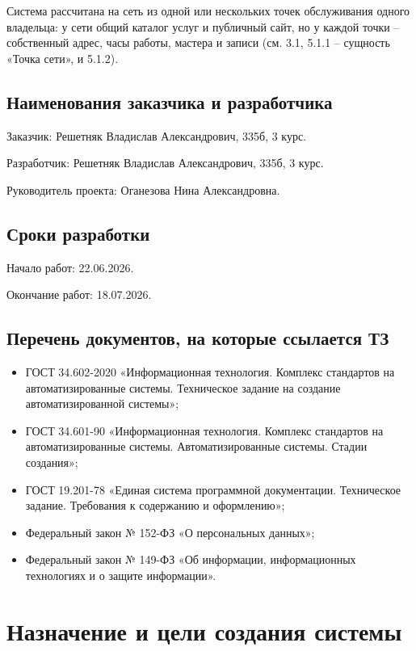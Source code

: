 Система рассчитана на сеть из одной или нескольких точек обслуживания одного владельца: у сети общий каталог услуг и публичный сайт, но у каждой точки -- собственный адрес, часы работы, мастера и записи (см. 3.1, 5.1.1 -- сущность «Точка сети», и 5.1.2).

\subsection{Наименования заказчика и разработчика}

Заказчик: Решетняк Владислав Александрович, 335б, 3 курс.

Разработчик: Решетняк Владислав Александрович, 335б, 3 курс.

Руководитель проекта: Оганезова Нина Александровна.

\subsection{Сроки разработки}

Начало работ: 22.06.2026.

Окончание работ: 18.07.2026.

\subsection{Перечень документов, на которые ссылается ТЗ}

\begin{itemize}
  \item ГОСТ 34.602-2020 «Информационная технология. Комплекс стандартов на автоматизированные системы. Техническое задание на создание автоматизированной системы»;
  \item ГОСТ 34.601-90 «Информационная технология. Комплекс стандартов на автоматизированные системы. Автоматизированные системы. Стадии создания»;
  \item ГОСТ 19.201-78 «Единая система программной документации. Техническое задание. Требования к содержанию и оформлению»;
  \item Федеральный закон № 152-ФЗ «О персональных данных»;
  \item Федеральный закон № 149-ФЗ «Об информации, информационных технологиях и о защите информации».
\end{itemize}



\section{Назначение и цели создания системы}

